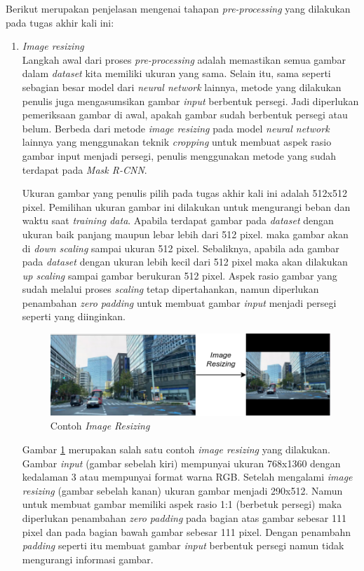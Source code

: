 Berikut merupakan penjelasan mengenai tahapan \textit{pre-processing} yang dilakukan pada tugas akhir kali ini:
\begin{enumerate}
	\item \textit{Image resizing}\\
		Langkah awal dari proses \textit{pre-processing} adalah memastikan semua gambar dalam \textit{dataset} kita memiliki ukuran yang sama. Selain itu, sama seperti sebagian besar model dari \textit{neural network} lainnya, metode yang dilakukan penulis juga mengasumsikan gambar \textit{input} berbentuk persegi. Jadi diperlukan pemeriksaan gambar di awal, apakah gambar sudah berbentuk persegi atau belum. Berbeda dari metode \textit{image resizing} pada model \textit{neural network} lainnya yang menggunakan teknik \textit{cropping} untuk membuat aspek rasio gambar input menjadi persegi, penulis menggunakan metode yang sudah terdapat pada \textit{Mask R-CNN}.
		
		Ukuran gambar yang penulis pilih pada tugas akhir kali ini adalah 512x512 pixel. Pemilihan ukuran gambar ini dilakukan untuk mengurangi beban dan waktu saat \textit{training data}. Apabila terdapat gambar pada \textit{dataset} dengan ukuran baik panjang maupun lebar lebih dari 512 pixel. maka gambar akan di \textit{down scaling} sampai ukuran 512 pixel. Sebaliknya, apabila ada gambar pada \textit{dataset} dengan ukuran lebih kecil dari 512 pixel maka akan dilakukan \textit{up scaling} sampai gambar berukuran 512 pixel. Aspek rasio gambar yang sudah melalui proses \textit{scaling} tetap dipertahankan, namun diperlukan penambahan \textit{zero padding} untuk membuat gambar \textit{input} menjadi persegi seperti yang diinginkan.
		
		\begin{figure}[ht]
			\centering
			\includegraphics[scale=0.5]{gambar/image-resizing.png}
			\caption{Contoh \textit{Image Resizing}}
			\label{fig:image-resizing}
		\end{figure}
		
		Gambar \ref{fig:image-resizing} merupakan salah satu contoh \textit{image resizing} yang dilakukan. Gambar \textit{input} (gambar sebelah kiri) mempunyai ukuran 768x1360 dengan kedalaman 3 atau mempunyai format warna RGB. Setelah mengalami \textit{image resizing} (gambar sebelah kanan) ukuran gambar menjadi 290x512. Namun untuk membuat gambar memiliki aspek rasio 1:1 (berbetuk persegi) maka diperlukan penambahan \textit{zero padding} pada bagian atas gambar sebesar 111 pixel dan pada bagian bawah gambar sebesar 111 pixel. Dengan penambahn \textit{padding} seperti itu membuat gambar \textit{input} berbentuk persegi namun tidak mengurangi informasi gambar. 
		   

\end{enumerate}
